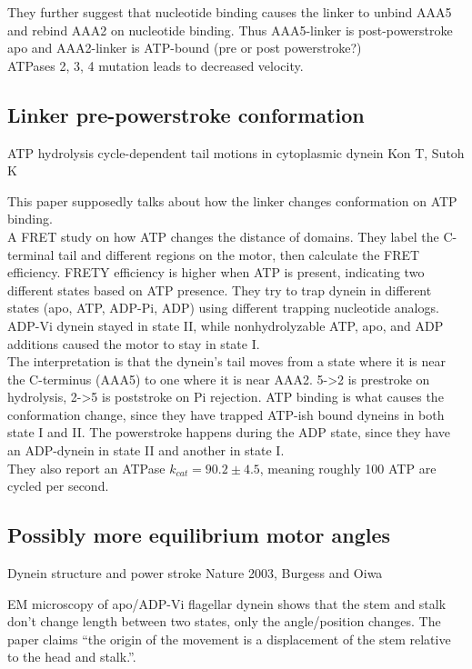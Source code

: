 \documentclass[10pt]{article} %
\begin{document}
They further suggest that nucleotide binding causes the linker to unbind AAA5 and rebind AAA2 on nucleotide binding. Thus AAA5-linker is post-powerstroke apo and AAA2-linker is ATP-bound (pre or post powerstroke?)\\

ATPases 2, 3, 4 mutation leads to decreased velocity.\\

\subsection{Linker pre-powerstroke conformation}
ATP hydrolysis cycle-dependent tail motions in cytoplasmic dynein
Kon T, Sutoh K

This paper supposedly talks about how the linker changes conformation on ATP binding.\\

A FRET study on how ATP changes the distance of domains. They label the C-terminal tail and different regions on the motor, then calculate the FRET efficiency. FRETY efficiency is higher when ATP is present, indicating two different states based on ATP presence. They try to trap dynein in different states (apo, ATP, ADP-Pi, ADP) using different trapping nucleotide analogs. ADP-Vi dynein stayed in state II, while nonhydrolyzable ATP, apo, and ADP additions caused the motor to stay in state I.\\

The interpretation is that the dynein's tail moves from a state where it is near the C-terminus (AAA5) to one where it is near AAA2. 5->2 is prestroke on hydrolysis, 2->5 is poststroke on Pi rejection. ATP binding is what causes the conformation change, since they have trapped ATP-ish bound dyneins in both state I and II. The powerstroke happens during the ADP state, since they have an ADP-dynein in state II and another in state I.\\

They also report an ATPase $k_{cat} = 90.2 \pm 4.5$, meaning roughly 100 ATP are cycled per second.\\

\subsection{Possibly more equilibrium motor angles}
Dynein structure and power stroke
Nature 2003, Burgess and Oiwa

EM microscopy of apo/ADP-Vi flagellar dynein shows that the stem and stalk don't change length between two states, only the angle/position changes. The paper claims ``the origin of the movement is a displacement of the stem relative to the head and stalk.''.
\end{document}
